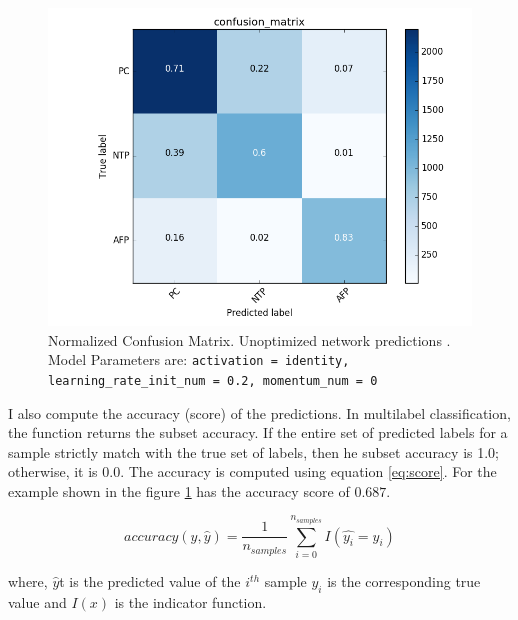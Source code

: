 \begin{figure}[!h]
\begin{center}
        \includegraphics[width=0.5\textheight]{img/confusion_matrix_bad.png}
        \caption{Normalized Confusion Matrix. Unoptimized network predictions . Model Parameters are: \texttt{activation = identity, learning\_rate\_init\_num = 0.2, momentum\_num = 0}}  \label{fig:confusionbad}
\end{center}
\end{figure}

I also compute the accuracy (score) of the predictions.  In multilabel classification, the function returns the subset accuracy. If the entire set of predicted labels for a sample strictly match with the true set of labels, then he subset accuracy is 1.0; otherwise, it is 0.0. The accuracy is computed using equation \ref{eq:score}. For the example shown in the figure \ref{fig:confusionbad} has the accuracy score of $0.687$.

\begin{equation}
accuracy(y, \hat{y}) = \frac{1}{n_{samples}}\sum_{i=0}^{n_{samples}}I(\hat{y_i} = y_i)
\label{eq:score}
\end{equation}

where, $\hat{y}$t is the predicted value of the $i^{th}$ sample $y_i$ is the corresponding true value and $I(x)$ is the indicator function.

